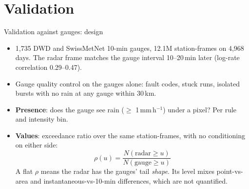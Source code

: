 \documentclass[aspectratio=169,10pt]{beamer}
\newcommand{\mmh}{\,mm\,h$^{-1}$}
\begin{document}
\section{Validation}

\begin{frame}{Validation against gauges: design}
  \small
  \begin{itemize}
    \item 1,735 DWD and SwissMetNet 10-min gauges, 12.1M station-frames on 4,968 days. The radar
      frame matches the gauge interval 10--20\,min later (log-rate correlation 0.29--0.47).
    \item Gauge quality control on the gauges alone: fault codes, stuck runs, isolated bursts
      with no rain at any gauge within 30\,km.
    \item \textbf{Presence}: does the gauge see rain ($\ge$ 1\mmh) under a pixel? Per rule and
      intensity bin.
    \item \textbf{Values}: exceedance ratio over the same station-frames, with no conditioning
      on either side:
      \[ \rho(u) = \frac{N(\text{radar} \ge u)}{N(\text{gauge} \ge u)} \]
      A flat $\rho$ means the radar has the gauges' tail \emph{shape}. Its level mixes
      point-vs-area and instantaneous-vs-10-min differences, which are not quantified.
  \end{itemize}
\end{frame}
\end{document}
